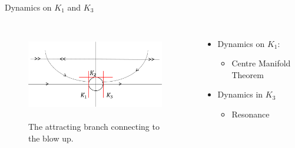 \documentclass[11pt]{beamer}
\begin{document}
\begin{frame}{Dynamics on $K_1$ and $K_3$}
\begin{columns}
\begin{figure}
    \centering
    \includegraphics[height=4cm,width=6cm]{Charts_graph.png}
    \caption{The attracting branch connecting to the blow up.}
\end{figure}
\begin{itemize}
\item Dynamics on $K_1$:
\begin{itemize}
\item Centre Manifold Theorem

\end{itemize}
\item Dynamics in $K_3$
\begin{itemize}
\item Resonance
\end{itemize}
\end{itemize}
\end{columns}
\end{frame}
\end{document}
